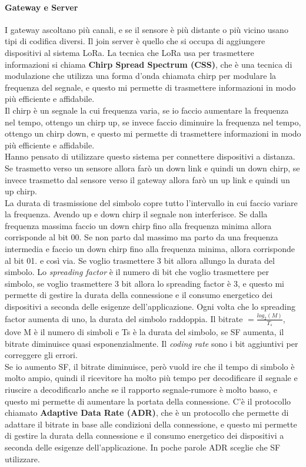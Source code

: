 \paragraph{Gateway e Server}
I gateway ascoltano più canali, e se il sensore è più distante o più vicino usano tipi di codifica diversi. Il join server è quello che si occupa di aggiungere dispositivi al sistema LoRa. 
La tecnica che LoRa usa per trasmettere informazioni si chiama \textbf{Chirp Spread Spectrum (CSS)}, che è una tecnica di modulazione che utilizza una forma d'onda chiamata chirp per modulare la frequenza del segnale, e questo mi permette di trasmettere informazioni in modo più efficiente e affidabile.\\
Il chirp è un segnale la cui frequenza varia, se io faccio aumentare la frequenza nel tempo, ottengo un chirp up, se invece faccio diminuire la frequenza nel tempo, ottengo un chirp down, e questo mi permette di trasmettere informazioni in modo più efficiente e affidabile.\\
Hanno pensato di utilizzare questo sistema per connettere dispositivi a distanza. Se trasmetto verso un sensore allora farò un down link e quindi un down chirp, se invece trasmetto dal sensore verso il gateway allora farò un up link e quindi un up chirp.\\
La durata di trasmissione del simbolo copre tutto l'intervallo in cui faccio variare la frequenza. Avendo up e down chirp il segnale non interferisce. Se dalla frequenza massima faccio un down chirp fino alla frequenza minima allora corrisponde al bit 00. Se non parto dal massimo ma parto da una frequenza intermedia e faccio un down chirp fino alla frequenza minima, allora corrisponde al bit 01. e così via. Se voglio trasmettere 3 bit allora allungo la durata del simbolo. Lo \textit{spreading factor} è il numero di bit che voglio trasmettere per simbolo, se voglio trasmettere 3 bit allora lo spreading factor è 3, e questo mi permette di gestire la durata della connessione e il consumo energetico dei dispositivi a seconda delle esigenze dell'applicazione. Ogni volta che lo spreading factor aumenta di uno, la durata del simbolo raddoppia. Il bitrate $=\frac {log_2(M)}{T_s}$, dove M è il numero di simboli e Ts è la durata del simbolo, se SF aumenta, il bitrate diminuisce quasi esponenzialmente. Il \textit{coding rate} sono i bit aggiuntivi per correggere gli errori.\\ 
Se io aumento SF, il bitrate diminuisce, però vuold ire che il tempo di simbolo è molto ampio, quindi il ricevitore ha molto più tempo per decodificare il segnale e riuscire a decodificarlo anche se il rapporto segnale-rumore è molto basso, e questo mi permette di aumentare la portata della connessione. C'è il protocollo chiamato \textbf{Adaptive Data Rate (ADR)}, che è un protocollo che permette di adattare il bitrate in base alle condizioni della connessione, e questo mi permette di gestire la durata della connessione e il consumo energetico dei dispositivi a seconda delle esigenze dell'applicazione. In poche parole ADR sceglie che SF utilizzare.
